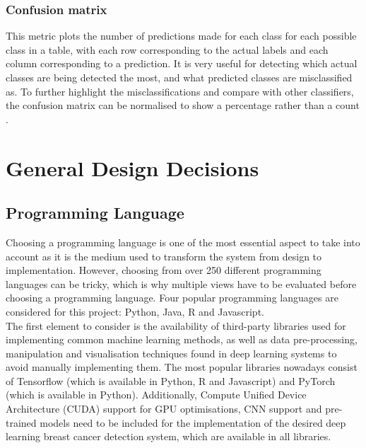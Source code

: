 \subsubsection{Confusion matrix} 

This metric plots the number of predictions made for each class for each possible class in a table, with each row corresponding to the actual labels and each column corresponding to a prediction. It is very useful for detecting which actual classes are being detected the most, and what predicted classes are misclassified as. To further highlight the misclassifications and compare with other classifiers, the confusion matrix can be normalised to show a percentage rather than a count \citep{Geron2019}.


\section{General Design Decisions}

\subsection{Programming Language}

Choosing a programming language is one of the most essential aspect to take into account as it is the medium used to transform the system from design to implementation. However, choosing from over 250 different programming languages \citep{tiobe} can be tricky, which is why multiple views have to be evaluated before choosing a programming language. Four popular programming languages are considered for this project: Python, Java, R and  Javascript.\\

The first element to consider is the availability of third-party libraries used for implementing common machine learning methods, as well as data pre-processing, manipulation and visualisation techniques found in deep learning systems to avoid manually implementing them. The most popular libraries nowadays consist of Tensorflow (which is available in Python, R and Javascript) and PyTorch (which is available in Python). Additionally, Compute Unified Device Architecture (CUDA) support for GPU optimisations, CNN support and pre-trained models need to be included for the implementation of the desired deep learning breast cancer detection system, which are available in all libraries.\\

